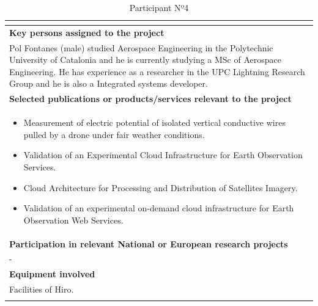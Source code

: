 \begin{longtable}[H]{|p{0.7cm}|p{4cm}|p{7cm}|p{1.3cm}|}
	\multicolumn{4}{|p{14.5cm}|}{}  \\ \hline
	
	\multicolumn{4}{|p{13cm}|}{\textbf{Key persons assigned to the project}}   \\ \hline
	
	\multicolumn{4}{|p{14.5cm}|}{Pol Fontanes (male) studied Aerospace Engineering in the Polytechnic University of Catalonia and he is currently studying a MSc of Aerospace Engineering. He has experience as a researcher in the UPC Lightning Research Group and he is also a Integrated systems developer.} \\ \hline
	
	\multicolumn{4}{|p{13cm}|}{\textbf{Selected publications or products/services relevant to the project}}  \\ \hline
	
	\multicolumn{4}{|p{14.5cm}|}{
		\begin{itemize}
			\item Measurement of electric potential of isolated vertical conductive wires pulled by a drone under fair weather conditions.
			\item Validation of an Experimental Cloud Infrastructure for Earth Observation Services.
			\item Cloud Architecture for Processing and Distribution of Satellites Imagery.
			\item Validation of an experimental on-demand cloud infrastructure for Earth Observation Web Services.
		\end{itemize}}  \\ \hline
	
	\multicolumn{4}{|p{13cm}|}{\textbf{Participation in relevant National or European research projects}}  \\ \hline
	
	\multicolumn{4}{|p{14.5cm}|}{-}  \\ \hline
	
	\multicolumn{4}{|p{13cm}|}{\textbf{Equipment involved}}  \\ \hline
	
	\multicolumn{4}{|p{14.5cm}|}{Facilities of Hiro.}  \\ \hline
	\caption{Participant Nº4}
\end{longtable}

